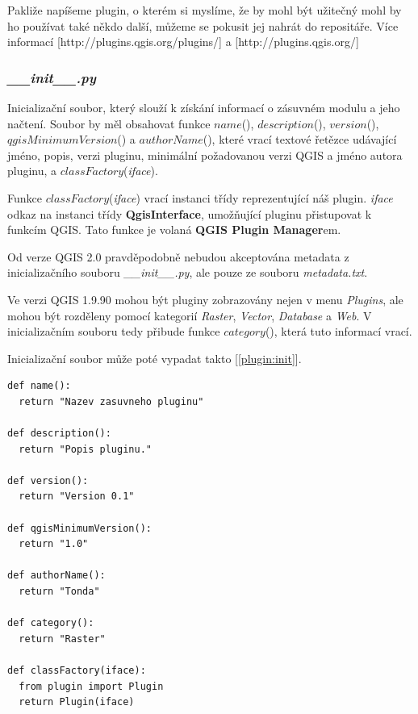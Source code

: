 Pakliže napíšeme plugin, o kterém si myslíme, že by mohl být užitečný mohl by ho používat také někdo další, můžeme se pokusit jej nahrát do repositáře. Více informací [http://plugins.qgis.org/plugins/] a [http://plugins.qgis.org/]

\subsubsection*{\textit{\_\_init\_\_.py}}
Inicializační soubor, který slouží k získání informací o zásuvném modulu a jeho načtení. Soubor by měl obsahovat funkce $name$(), $description$(), $version$(), $qgisMinimumVersion$() a $authorName$(), které vrací textové řetězce udávající jméno, popis, verzi pluginu, minimální požadovanou verzi QGIS a jméno autora pluginu, a $classFactory$(\textit{iface}).

Funkce $classFactory$(\textit{iface}) vrací instanci třídy reprezentující náš plugin. \textit{iface} odkaz na instanci třídy \textbf{QgisInterface}, umožňující pluginu přistupovat k funkcím QGIS. Tato funkce je volaná \textbf{QGIS Plugin Manager}em.

Od verze QGIS 2.0 pravděpodobně nebudou akceptována metadata z inicializačního souboru \textit{\_\_init\_\_.py}, ale pouze ze souboru \textit{metadata.txt}.

Ve verzi QGIS 1.9.90 mohou být pluginy zobrazovány nejen v menu \textit{Plugins}, ale mohou být rozděleny pomocí kategorií \textit{Raster}, \textit{Vector}, \textit{Database} a \textit{Web}. V inicializačním souboru tedy přibude funkce $category$(), která tuto informací vrací.

\newpage
Inicializační soubor může poté vypadat takto [\autoref{plugin:init}]. \\

\begin{lstlisting}[caption={\_\_init\_\_.py - inicializační soubor},label=plugin:init]
def name():
  return "Nazev zasuvneho pluginu"

def description():
  return "Popis pluginu."

def version():
  return "Version 0.1"

def qgisMinimumVersion():
  return "1.0"

def authorName():
  return "Tonda"

def category():
  return "Raster"

def classFactory(iface):
  from plugin import Plugin
  return Plugin(iface)
\end{lstlisting}

